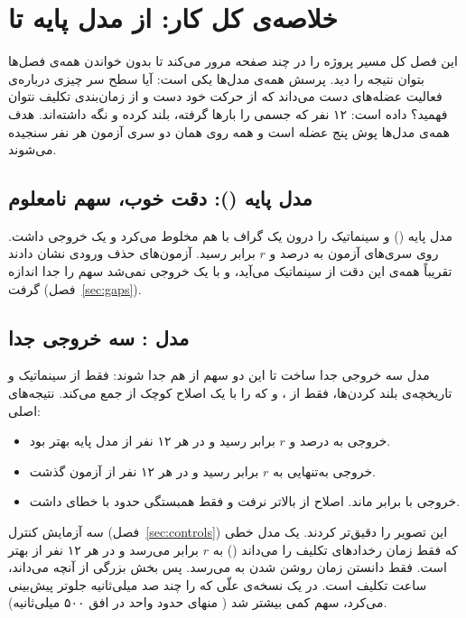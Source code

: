 \section{خلاصه‌ی کل کار: از مدل پایه تا }
\label{sec:overview}

این فصل کل مسیر پروژه را در چند صفحه مرور می‌کند تا بدون خواندن همه‌ی فصل‌ها بتوان نتیجه را دید. پرسش همه‌ی مدل‌ها یکی است: آیا  سطح سر چیزی درباره‌ی فعالیت عضله‌های دست می‌داند که از حرکت خود دست و از زمان‌بندی تکلیف نتوان فهمید؟ داده  است: ۱۲ نفر که جسمی را بارها گرفته، بلند کرده و نگه داشته‌اند. هدف همه‌ی مدل‌ها پوش  پنج عضله است و همه روی همان دو سری آزمون هر نفر سنجیده می‌شوند.

\subsection{مدل پایه (): دقت خوب، سهم نامعلوم }

مدل پایه ()  و سینماتیک را درون یک گراف با هم مخلوط می‌کرد و یک خروجی داشت. روی سری‌های آزمون به   درصد و $r$ برابر  رسید. آزمون‌های حذف ورودی نشان دادند تقریباً همه‌ی این دقت از سینماتیک می‌آید، و با یک خروجی نمی‌شد سهم  را جدا اندازه گرفت (فصل~\ref{sec:gaps}).

\subsection{مدل : سه خروجی جدا}

مدل  سه خروجی جدا ساخت تا این دو سهم از هم جدا شوند:  فقط از سینماتیک و تاریخچه‌ی بلند کردن‌ها،  فقط از ، و  که  را با یک اصلاح کوچک از  جمع می‌کند. نتیجه‌های اصلی:

\begin{itemize}
\item خروجی  به   درصد و $r$ برابر  رسید و در هر ۱۲ نفر از مدل پایه بهتر بود.
\item خروجی  به‌تنهایی به $r$ برابر  رسید و در هر ۱۲ نفر از آزمون  گذشت.
\item خروجی  با  برابر ماند.  اصلاح  از  بالاتر نرفت و  فقط همبستگی حدود  با خطای  داشت.
\end{itemize}

سه آزمایش کنترل (فصل~\ref{sec:controls}) این تصویر را دقیق‌تر کردند. یک مدل خطی که فقط زمان رخدادهای تکلیف را می‌داند () به $r$ برابر  می‌رسد و در هر ۱۲ نفر از  بهتر است. فقط دانستن زمان روشن شدن  به  می‌رسد. پس بخش بزرگی از آنچه  می‌داند، ساعت تکلیف است. در یک نسخه‌ی علّی که  را چند صد میلی‌ثانیه جلوتر پیش‌بینی می‌کرد، سهم  کمی بیشتر شد ( منهای  حدود  واحد  در افق ۵۰۰ میلی‌ثانیه).

